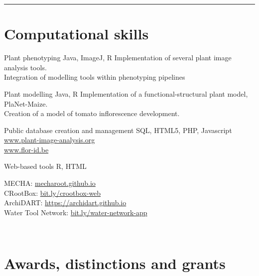 \documentclass[]{friggeri-cv} %
\begin{document}

\rule{\linewidth}{0.5pt}
\section{Computational skills}

\descr 
{Plant phenotyping}
{Java, ImageJ, R}
{Implementation of several plant image analysis tools.\\
Integration of modelling tools within phenotyping pipelines}

\descr
{Plant modelling}
{Java, R}
{Implementation of a functional-structural plant model, PlaNet-Maize.\\
Creation of a model of tomato inflorescence development.
}


\descr
{Public database creation and management}
{SQL, HTML5, PHP, Javascript}
{\href{http://www.plant-image-analysis.org}{www.plant-image-analysis.org}\\
\href{http://www.flor-id.be}{www.flor-id.be}
}

\descr
{Web-based tools}
{R, HTML}
{MECHA: \href{https://mecharoot.github.io}{mecharoot.github.io}\\
CRootBox: \href{http://bit.ly/crootbox-web}{bit.ly/crootbox-web}\\
ArchiDART: \href{https://archidart.github.io}{https://archidart.github.io}\\
Water Tool Network: \href{http://bit.ly/water-network-app}{bit.ly/water-network-app}

}



\newpage
~


\section{Awards, distinctions and grants}
\end{document}
